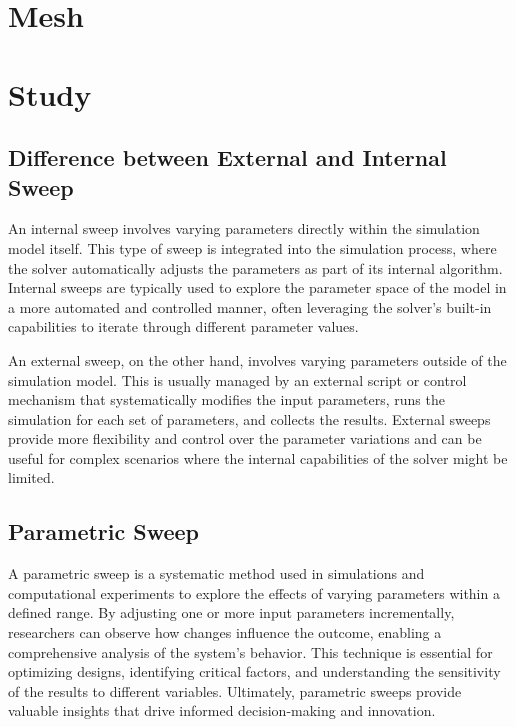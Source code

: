 \documentclass{report}
\begin{document}
    \section{Mesh}
    
    \section{Study}
        \subsection{Difference between External and Internal Sweep}
            An internal sweep involves varying parameters directly within the 
            simulation model itself. This type of sweep is integrated into the 
            simulation process, where the solver automatically adjusts the parameters 
            as part of its internal algorithm. Internal sweeps are typically used to 
            explore the parameter space of the model in a more automated and 
            controlled manner, often leveraging the solver's built-in capabilities 
            to iterate through different parameter values.

            
            \vspace{1em} \noindent An external sweep, on the other hand, involves varying parameters outside 
            of the simulation model. This is usually managed by an external script 
            or control mechanism that systematically modifies the input parameters, 
            runs the simulation for each set of parameters, and collects the results. 
            External sweeps provide more flexibility and control over the parameter 
            variations and can be useful for complex scenarios where the internal 
            capabilities of the solver might be limited.
        \subsection{Parametric Sweep}
            A parametric sweep is a systematic method used in simulations and computational 
            experiments to explore the effects of varying parameters within a defined range. 
            By adjusting one or more input parameters incrementally, researchers can observe 
            how changes influence the outcome, enabling a comprehensive analysis of the 
            system's behavior. This technique is essential for optimizing designs, 
            identifying critical factors, and understanding the sensitivity of the results 
            to different variables. Ultimately, parametric sweeps provide valuable insights 
            that drive informed decision-making and innovation.
\end{document}
